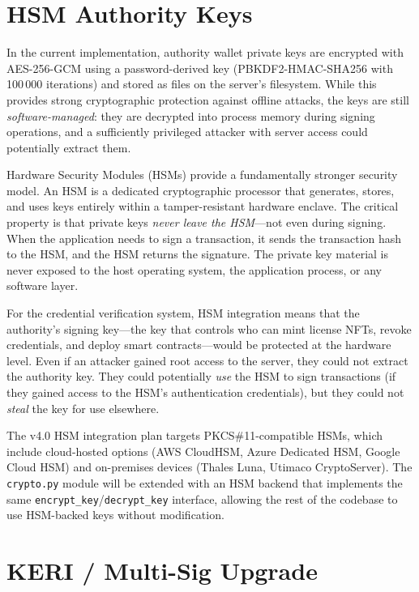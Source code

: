 \section{HSM Authority Keys}
\label{sec:hsm}

In the current implementation, authority wallet private keys are encrypted
with AES-256-GCM using a password-derived key (PBKDF2-HMAC-SHA256 with
100\,000 iterations) and stored as files on the server's filesystem.  While
this provides strong cryptographic protection against offline attacks, the
keys are still \emph{software-managed}: they are decrypted into process
memory during signing operations, and a sufficiently privileged attacker
with server access could potentially extract them.

Hardware Security Modules (HSMs) provide a fundamentally stronger security
model.  An HSM is a dedicated cryptographic processor that generates, stores,
and uses keys entirely within a tamper-resistant hardware enclave.  The
critical property is that private keys \emph{never leave the HSM}---not even
during signing.  When the application needs to sign a transaction, it sends
the transaction hash to the HSM, and the HSM returns the signature.  The
private key material is never exposed to the host operating system, the
application process, or any software layer.

For the credential verification system, HSM integration means that the
authority's signing key---the key that controls who can mint license NFTs,
revoke credentials, and deploy smart contracts---would be protected at the
hardware level.  Even if an attacker gained root access to the server, they
could not extract the authority key.  They could potentially \emph{use} the
HSM to sign transactions (if they gained access to the HSM's authentication
credentials), but they could not \emph{steal} the key for use elsewhere.

The v4.0 HSM integration plan targets PKCS\#11-compatible HSMs, which
include cloud-hosted options (AWS CloudHSM, Azure Dedicated HSM, Google
Cloud HSM) and on-premises devices (Thales Luna, Utimaco CryptoServer).
The \texttt{crypto.py} module will be extended with an HSM backend that
implements the same \texttt{encrypt\_key}/\texttt{decrypt\_key} interface,
allowing the rest of the codebase to use HSM-backed keys without
modification.


\section{KERI / Multi-Sig Upgrade}
\label{sec:keri-multisig}

